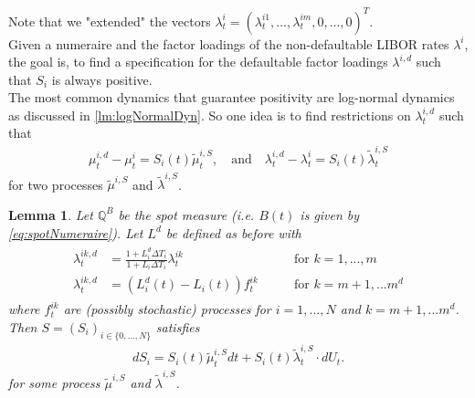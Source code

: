 \documentclass[12pt]{article}
\newtheorem{lemma}[theorem]{Lemma}
\begin{document}
	Note that we "extended" the vectors $\lambda^{i}_t = (\lambda^{i 1}_t, ..., \lambda^{i m}_t, 0, ..., 0)^T$.\\
	Given a numeraire and the factor loadings of the non-defaultable LIBOR rates $\lambda^i$, the goal is, to find a specification for the defaultable factor loadings $\lambda^{i,d}$ such that $S_i$ is always positive.\\
	The most common dynamics that guarantee positivity are log-normal dynamics as discussed in \cref{lm:logNormalDyn}. So one idea is to find restrictions on $\lambda^{i,d}_t$ such that 
	\begin{align*}
		\mu^{i,d}_t - \mu^{i}_t = S_i(t)\tilde{\mu}^{i,S}_t, \quad \text{and} 
		\quad \lambda^{i,d}_t - \lambda^{i}_t = S_i(t)\tilde{\lambda}^{i,S}_t
	\end{align*}
	for two processes $\tilde{\mu}^{i,S}$ and $\tilde{\lambda}^{i,S}$.
	\begin{lemma}
		Let $\mathbb{Q}^B$ be the spot measure (i.e. $B(t)$ is given by \cref{eq:spotNumeraire}).
		Let $L^d$ be defined as before with 
		\begin{align}
			\begin{aligned}
				\lambda^{i k,d}_t &= \frac{1+L^d_i\Delta T_i}{1+L_i\Delta T_i} \lambda^{i k}_t \quad \quad & \text{for } k= 1,...,m\\
				\lambda^{i k,d}_t &= \left(L^d_i(t) - L_i(t)\right)f^{i k}_t \quad \quad & \text{for } k= m+1, ... m^d
			\end{aligned}
		\end{align}
		where $f^{i k}_t$ are (possibly stochastic) processes for $i=1, ..., N$ and $k= m+1, ... m^d$.\\
		Then $S = (S_i)_{i\in \{0, ..., N\}}$ satisfies 
		\begin{align*}
			dS_i = S_i(t)\tilde{\mu}^{i,S}_t dt + S_i(t)\tilde{\lambda}^{i,S}_t \cdot dU_t.
		\end{align*}
		for some process $\tilde{\mu}^{i,S}$ and $\tilde{\lambda}^{i,S}$.
	\end{lemma}
\end{document}
